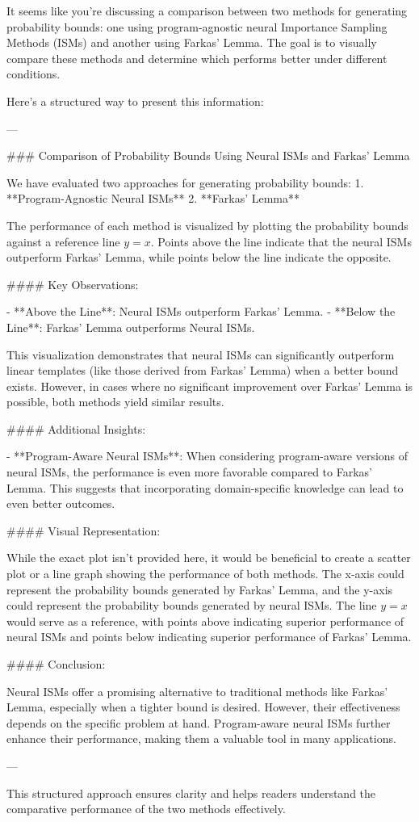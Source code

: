 It seems like you're discussing a comparison between two methods for generating probability bounds: one using program-agnostic neural Importance Sampling Methods (ISMs) and another using Farkas' Lemma. The goal is to visually compare these methods and determine which performs better under different conditions.

Here's a structured way to present this information:

---

### Comparison of Probability Bounds Using Neural ISMs and Farkas' Lemma

We have evaluated two approaches for generating probability bounds:
1. **Program-Agnostic Neural ISMs**
2. **Farkas' Lemma**

The performance of each method is visualized by plotting the probability bounds against a reference line \(y = x\). Points above the line indicate that the neural ISMs outperform Farkas' Lemma, while points below the line indicate the opposite.

#### Key Observations:

- **Above the Line**: Neural ISMs outperform Farkas' Lemma.
- **Below the Line**: Farkas' Lemma outperforms Neural ISMs.

This visualization demonstrates that neural ISMs can significantly outperform linear templates (like those derived from Farkas' Lemma) when a better bound exists. However, in cases where no significant improvement over Farkas' Lemma is possible, both methods yield similar results.

#### Additional Insights:

- **Program-Aware Neural ISMs**: When considering program-aware versions of neural ISMs, the performance is even more favorable compared to Farkas' Lemma. This suggests that incorporating domain-specific knowledge can lead to even better outcomes.

#### Visual Representation:

While the exact plot isn't provided here, it would be beneficial to create a scatter plot or a line graph showing the performance of both methods. The x-axis could represent the probability bounds generated by Farkas' Lemma, and the y-axis could represent the probability bounds generated by neural ISMs. The line \(y = x\) would serve as a reference, with points above indicating superior performance of neural ISMs and points below indicating superior performance of Farkas' Lemma.

#### Conclusion:

Neural ISMs offer a promising alternative to traditional methods like Farkas' Lemma, especially when a tighter bound is desired. However, their effectiveness depends on the specific problem at hand. Program-aware neural ISMs further enhance their performance, making them a valuable tool in many applications.

---

This structured approach ensures clarity and helps readers understand the comparative performance of the two methods effectively.